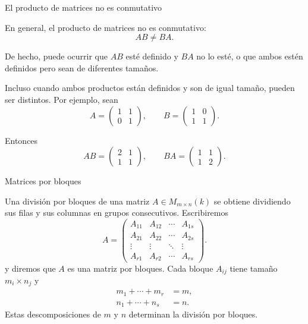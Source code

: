 \begin{frame}{El producto de matrices no es conmutativo}

En general, el producto de matrices \alert{no es conmutativo}:
\[
AB\neq BA.
\]

De hecho, puede ocurrir que \(AB\) esté definido y \(BA\) no lo esté, o que ambos estén definidos pero sean de diferentes tamaños.

\medskip

Incluso cuando ambos productos están definidos y son de igual tamaño, pueden ser distintos.
Por ejemplo, sean
\[
A=
\begin{pmatrix}
1&1\\
0&1
\end{pmatrix},
\qquad
B=
\begin{pmatrix}
1&0\\
1&1
\end{pmatrix}.
\]

Entonces
\[
AB=
\begin{pmatrix}
2&1\\
1&1
\end{pmatrix},
\qquad
BA=
\begin{pmatrix}
1&1\\
1&2
\end{pmatrix}.
\]
\end{frame}

\begin{frame}{Matrices por bloques}

\begin{definition}
Una \alert{división por bloques} de una matriz
\(A\in M_{m\times n}(k)\) se obtiene dividiendo sus filas y sus
columnas en grupos consecutivos. Escribiremos
\[
A=
\left(
\begin{array}{c|c|c|c}
A_{11} & A_{12} & \cdots & A_{1s}\\
\hline
A_{21} & A_{22} & \cdots & A_{2s}\\
\hline
\vdots & \vdots & \ddots & \vdots\\
\hline
A_{r1} & A_{r2} & \cdots & A_{rs}
\end{array}
\right).
\]
y diremos que \(A\) es una \alert{matriz por bloques}. Cada \alert{bloque} $A_{ij}$ tiene tamaño $m_i\times n_j$ y
\begin{align*}
m_1+\cdots+m_r&=m,\\
n_1+\cdots+n_s&=n.	
\end{align*}
Estas descomposiciones de $m$ y $n$ determinan la división por bloques.
\end{definition}
\end{frame}


